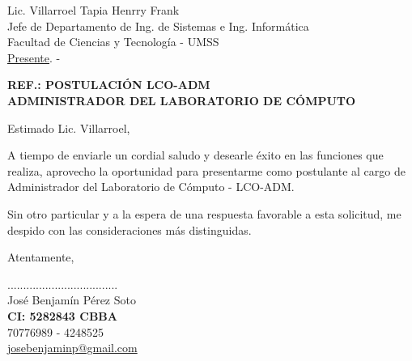 \documentclass[letterpaper,12pt]{letter}
\begin{document}
\date{3 de julio de 2012}
\begin{letter}{Lic. Villarroel Tapia Henrry Frank \\ Jefe de Departamento de Ing. de Sistemas e Ing. Inform\'atica\\ Facultad de Ciencias y Tecnolog\'ia - UMSS \\ \underline {Presente}. -}

\begin{center}
	\opening{\textbf{REF.: POSTULACI\'ON LCO-ADM \\ ADMINISTRADOR DEL LABORATORIO DE C\'OMPUTO}}
\end{center}

Estimado Lic. Villarroel,

A tiempo de enviarle un cordial saludo y desearle éxito en las funciones que realiza, 
aprovecho la oportunidad para presentarme como postulante al cargo de Administrador del Laboratorio de 
C\'omputo - LCO-ADM.

Sin otro particular y a la espera de una respuesta favorable a esta solicitud, me despido con las consideraciones más distinguidas.

Atentamente,

\vspace{3cm}

\begin{center}
...................................\\
Jos\'e Benjam\'in P\'erez Soto\\
{\bfseries CI: 5282843 CBBA} \\
70776989 - 4248525 \\
\url {josebenjaminp@gmail.com}
\end{center}
\end{letter}
\end{document}
